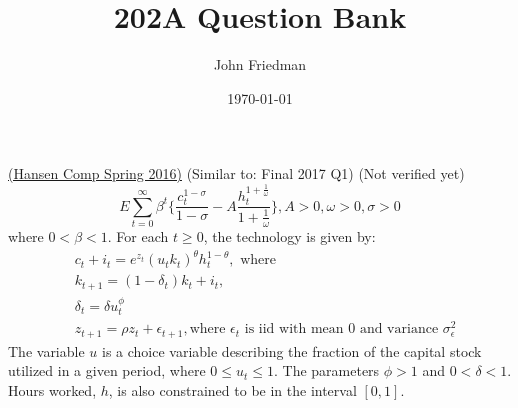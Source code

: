 \documentclass[answers]{exam}
\title{202A Question Bank}
\author{John Friedman}
\date{\today}
\begin{document}
\maketitle

\begin{questions}

    \question \href{https://economics.ucla.edu/wp-content/uploads/2016/10/macro-f16.pdf}{(Hansen Comp Spring 2016)} (Similar to: Final 2017 Q1) (Not verified yet)
    $$E \sum_{t=0}^{\infty} \beta^t \{\frac{c_t^{1-\sigma}}{1-\sigma} - A \frac{h_t^{1+\frac{1}{\omega}}}{1+ \frac{1}{\omega}}\}, A> 0, \omega > 0, \sigma > 0$$
    where $0 < \beta < 1$. For each $t \geq 0$, the technology is given by:
    \begin{align*}
        &c_t + i_t = e^{z_t} (u_t k_t)^{\theta} h_t^{1-\theta}, \text{ where}\\
        &k_{t+1} = (1-\delta_t) k_t + i_t,\\
        &\delta_t = \delta u_t^\phi\\
        &z_{t+1} = \rho z_t + \epsilon_{t+1}, \text{where $\epsilon_{t}$ is iid with mean 0 and variance $\sigma_{\epsilon}^2$}
    \end{align*}
    The variable $u$ is a choice variable describing the fraction of the capital stock utilized in a given period, where $0 \leq u_t \leq 1$. The parameters $\phi > 1$ and $0 < \delta < 1$. Hours worked, $h$, is also constrained to be in the interval $[0,1]$.
\end{questions}
\end{document}
